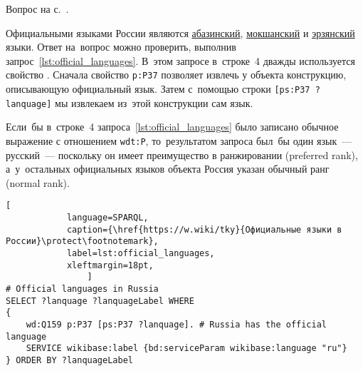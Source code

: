 \begin{task}
    \label{answer:official_language}
    \AnswerBackref Вопрос на с.~\pageref{lst:List_of_historical_countries}.


Официальными языками России являются 
    \href{https://w.wiki/myv}{абазинский}, 
    \href{https://w.wiki/myx}{мокшанский} 
    и \href{https://w.wiki/myy}{эрзянский} языки. 
    Ответ на~вопрос можно проверить, выполнив запрос~\ref{lst:official_languages}. 
    В~этом запросе в~строке~4 дважды используется свойство . 
    Сначала свойство \lstinline|p:P37| позволяет извлечь у объекта  конструкцию, 
    описывающую официальный язык. 
    Затем с~помощью строки \lstinline|[ps:P37 ?lanquage]| мы извлекаем из~этой конструкции сам язык.

    Если~бы в~строке~4 запроса~\ref{lst:official_languages} 
    было записано обычное выражение с отношением \lstinline|wdt:P|,  то~результатом запроса был~бы один язык~--- русский~--- поскольку 
    он имеет преимущество в ранжировании (preferred rank), 
    а~у~остальных официальных языков объекта Россия указан обычный ранг (normal rank). 
\begin{lstlisting}[ 
            language=SPARQL, 
            caption={\href{https://w.wiki/tky}{Официальные языки в России}\protect\footnotemark},
            label=lst:official_languages,
            xleftmargin=18pt, 
                ]
# Official languages in Russia
SELECT ?lanquage ?lanquageLabel WHERE
{ 
	wd:Q159 p:P37 [ps:P37 ?lanquage]. # Russia has the official language
	SERVICE wikibase:label {bd:serviceParam wikibase:language "ru"}
} ORDER BY ?lanquageLabel
\end{lstlisting}
\end{task}





\hfil{}\hfil%


